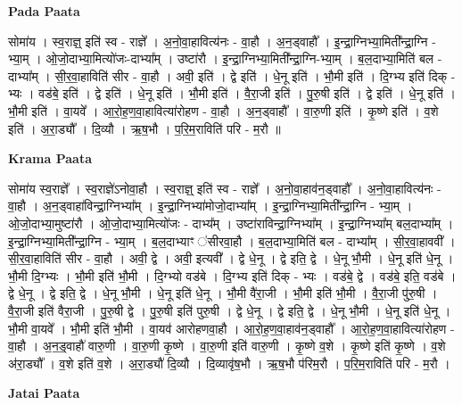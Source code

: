 \documentclass[17pt]{extarticle}
\begin{document}
\textbf{Pada Paata} \newline

सोमा॑य । स्व॒राज्ञ्॒ इति॑ स्व - राज्ञे᳚ । अ॒नो॒वा॒हावित्य॑नः - वा॒हौ । अ॒न॒ड्वाहौ᳚ । इ॒न्द्रा॒ग्निभ्या॒मिती᳚न्द्रा॒ग्नि - भ्या॒म् । ओ॒जो॒दाभ्या॒मित्यो॑जः-दाभ्या᳚म् । उष्टा॑रौ । इ॒न्द्रा॒ग्निभ्या॒मिती᳚न्द्रा॒ग्नि-भ्या॒म् । ब॒ल॒दाभ्या॒मिति॑ बल - दाभ्या᳚म् । सी॒र॒वा॒हाविति॑ सीर - वा॒हौ । अवी॒ इति॑ । द्वे इति॑ । धे॒नू इति॑ । भौ॒मी इति॑ । दि॒ग्भ्य इति॑ दिक् - भ्यः । वड॑बे॒ इति॑ । द्वे इति॑ । धे॒नू इति॑ । भौ॒मी इति॑ । वै॒रा॒जी इति॑ । पु॒रु॒षी इति॑ । द्वे इति॑ । धे॒नू इति॑ । भौ॒मी इति॑ । वा॒यवे᳚ । आ॒रो॒ह॒ण॒वा॒हावित्या॑रोहण - वा॒हौ । अ॒न॒ड्वाहौ᳚ । वा॒रु॒णी इति॑ । कृ॒ष्णे इति॑ । व॒शे इति॑ । अ॒रा॒ड्यौ᳚ । दि॒व्यौ । ऋ॒ष॒भौ । प॒रि॒म॒राविति॑ परि - म॒रौ ॥  \newline


\textbf{Krama Paata} \newline

सोमा॑य स्व॒राज्ञे᳚ । स्व॒राज्ञे॑ऽनोवा॒हौ । स्व॒राज्ञ्॒ इति॑ स्व - राज्ञे᳚ । अ॒नो॒वा॒हाव॑न॒ड्वाहौ᳚ । अ॒नो॒वा॒हावित्य॑नः - वा॒हौ । अ॒न॒ड्वाहा॑विन्द्रा॒ग्निभ्या᳚म् । इ॒न्द्रा॒ग्निभ्या॑मोजो॒दाभ्या᳚म् । इ॒न्द्रा॒ग्निभ्या॒मिती᳚न्द्रा॒ग्नि - भ्या॒म् । ओ॒जो॒दाभ्या॒मुष्टा॑रौ । ओ॒जो॒दाभ्या॒मित्यो॑जः - दाभ्य᳚म् । उष्टा॑राविन्द्रा॒ग्निभ्या᳚म् । इ॒न्द्रा॒ग्निभ्या᳚म् बल॒दाभ्या᳚म् । इ॒न्द्रा॒ग्निभ्या॒मिती᳚न्द्रा॒ग्नि - भ्या॒म् । ब॒ल॒दाभ्याꣳ ॑सीरवा॒हौ । ब॒ल॒दाभ्या॒मिति॑ बल - दाभ्या᳚म् । सी॒र॒वा॒हाववी᳚ । सी॒र॒वा॒हाविति॑ सीर - वा॒हौ । अवी॒ द्वे । अवी॒ इत्यवी᳚ । द्वे धे॒नू । द्वे इति॒ द्वे । धे॒नू भौ॒मी । धे॒नू इति॑ धे॒नू । भौ॒मी दि॒ग्भ्यः । भौ॒मी इति॑ भौ॒मी । दि॒ग्भ्यो वड॑बे । दि॒ग्भ्य इति॑ दिक् - भ्यः । वड॑बे॒ द्वे । वड॑बे॒ इति॒ वड॑बे । द्वे धे॒नू । द्वे इति॒ द्वे । धे॒नू भौ॒मी । धे॒नू इति॑ धे॒नू । भौ॒मी वै॑रा॒जी । भौ॒मी इति॑ भौ॒मी । वै॒रा॒जी पु॑रु॒षी । वै॒रा॒जी इति॑ वैरा॒जी । पु॒रु॒षी द्वे । पु॒रु॒षी इति॑ पुरु॒षी । द्वे धे॒नू । द्वे इति॒ द्वे । धे॒नू भौ॒मी । धे॒नू इति॑ धे॒नू । भौ॒मी वा॒यवे᳚ । भौ॒मी इति॑ भौ॒मी । वा॒यव॑ आरोहणवा॒हौ । आ॒रो॒ह॒ण॒वा॒हाव॑न॒ड्वाहौ᳚ । आ॒रो॒ह॒ण॒वा॒हावित्या॑रोहण - वा॒हौ । अ॒न॒ड्॒वाहौ॑ वारु॒णी । वा॒रु॒णी कृ॒ष्णे । वा॒रु॒णी इति॑ वारु॒णी । कृ॒ष्णे व॒शे । कृ॒ष्णे इति॑ कृ॒ष्णे । व॒शे अ॑रा॒ड्यौ᳚ । व॒शे इति॑ व॒शे । अ॒रा॒ड्यौ॑ दि॒व्यौ । दि॒व्यावृ॑ष॒भौ । ऋ॒ष॒भौ प॑रिम॒रौ । प॒रि॒म॒राविति॑ परि - म॒रौ । \newline

\textbf{Jatai Paata} \newline
\end{document}
